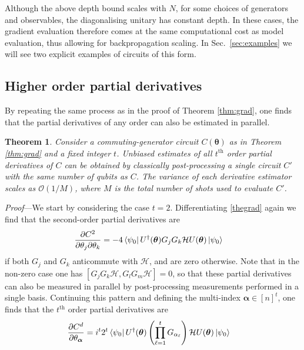 \documentclass[twocolumn]{revtex4-2}
\newtheorem{theorem}{Theorem}
\renewcommand{\vec}{\boldsymbol}
\begin{document}
Although the above depth bound scales with $N$, for some choices of generators and observables, the diagonalising unitary has constant depth. In these cases, the gradient evaluation therefore comes at the same computational cost as model evaluation, thus allowing for backpropagation scaling. In Sec.\ \ref{sec:examples} we will see two explicit examples of circuits of this form. 

\subsection{Higher order partial derivatives}
By repeating the same process as in the proof of Theorem \ref{thm:grad}, one finds that the partial derivatives of any order can also be estimated in parallel.

\begin{theorem}\label{thm:pds}
Consider a commuting-generator circuit $C(\vec{\theta})$ as in Theorem \ref{thm:grad} and a fixed integer $t$. Unbiased estimates of all $t^{\text{th}}$ order partial derivatives of $C$ can be obtained by classically post-processing a single circuit $C'$ with the same number of qubits as $C$. The variance of each derivative estimator scales as $\mathcal{O}(1/M)$, where $M$ is the total number of shots used to evaluate $C'$.
\end{theorem}
%
\emph{Proof}---We start by considering the case $t=2$. Differentiating \eqref{thegrad} again we find that the second-order partial derivatives are
\begin{align}
    \frac{\partial C^2}{\partial \theta_j\partial\theta_k} 
    &=-4\bra{\psi_0} U^{\dagger}(\vec{\theta})G_jG_k\mathcal{H}U(\vec{\theta})\ket{\psi_0}
\end{align}
if both $G_j$ and $G_k$ anticommute with $\mathcal{H}$, and are zero otherwise. Note that in the non-zero  case one has $[G_jG_k\mathcal{H},G_lG_m\mathcal{H}]=0$, so that these partial derivatives can also be measured in parallel by post-processing measurements performed in a single basis. Continuing this pattern and defining the multi-index $\vec{\alpha}\in[n]^t$, one finds that the $t^{\text{th}}$ order partial derivatives are
%
\begin{align}
    \frac{\partial C^d}{\partial \theta_{\vec{\alpha}}} &= i^{t}2^t\bra{\psi_0} U^{\dagger}(\vec{\theta})\left(\prod_{\ell=1}^t G_{\alpha_\ell}\right)\mathcal{H}U(\vec{\theta})\ket{\psi_0}
\end{align}
\end{document}
